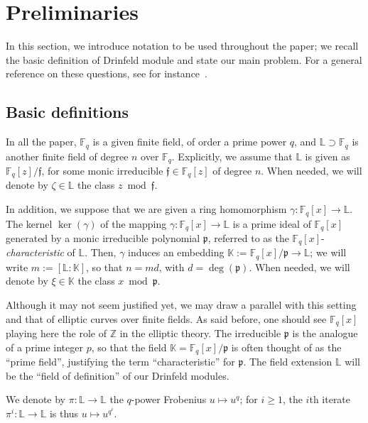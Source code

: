 \documentclass[sigconf]{acmart}
\newcommand{\K}{\mathbb{K}}
\newcommand{\F}{\mathbb{F}}
\newcommand{\Z}{\mathbb{Z}}
\renewcommand{\L}{\mathbb{L}}
\newcommand{\frakf}{\mathfrak{f}}
\newcommand{\frakp}{\mathfrak{p}}
\begin{document}

\section{Preliminaries}

In this section, we introduce notation to be used throughout the
paper; we recall the basic definition of Drinfeld module and state our
main problem. For a general reference on these questions, see for
instance~\cite{Goss96}.


\subsection{Basic definitions}

In all the paper, $\F_q$ is a given finite field, of order a prime
power $q$, and $\L \supset \F_q$ is another finite field of degree $n$
over $\F_q$. Explicitly, we assume that $\L$ is given as
$\F_q[z]/\frakf$, for some monic irreducible $\frakf \in \F_q[z]$ of
degree $n$. When needed, we will denote by $\zeta \in \L$ the class $z \bmod
\frakf$.

In addition, we suppose that we are given a ring homomorphism $\gamma:
\F_q[x] \to \L$. The kernel $\ker(\gamma)$ of the mapping $\gamma:
\F_q[x] \to \L$ is a prime ideal of $\F_q[x]$ generated by a monic
irreducible polynomial $\frakp$, referred to as the
$\F_q[x]$-\textit{characteristic} of $\L$. Then, $\gamma$ induces an
embedding $\K := \F_q[x]/\frakp \to \L$; we will write $m := [\L :
  \K]$, so that $n = md$, with $d=\deg(\frakp)$. When needed, we will
denote by $\xi \in \K$ the class $x \bmod \frakp$.

Although it may not seem justified yet, we may draw a parallel with
this setting and that of elliptic curves over finite fields. As said
before, one should see $\F_q[x]$ playing here the role of $\Z$ in the
elliptic theory. The irreducible $\frakp$ is the analogue of a prime
integer $p$, so that the field $\K = \F_q[x]/\frakp$ is often thought
of as the ``prime field'', justifying the term ``characteristic'' for
$\frakp$. The field extension $\L$ will be the ``field of
definition'' of our Drinfeld modules.

We denote by $\pi: \L \to \L$ the $q$-power Frobenius $u \mapsto u^q$;
for $i \ge 1$, the $i$th iterate $\pi^i: \L \to \L$ is thus $u \mapsto
u^{q^i}$.
\end{document}
